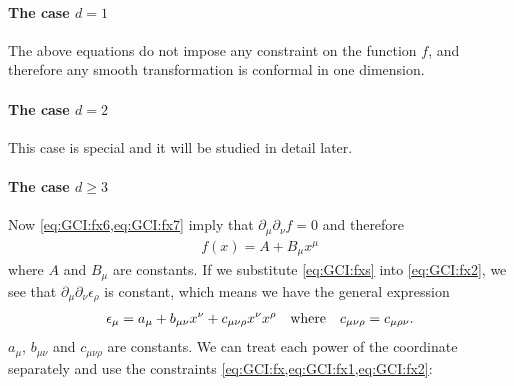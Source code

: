 \documentclass[10pt]{article}
\begin{document}
\paragraph{The case $d=1$}
The above equations do not impose any constraint on the function $f$, and therefore any smooth transformation is conformal in one dimension.
\paragraph{The case $d=2$}
This case is special and it will be studied in detail later.
\paragraph{The case $d\geq3$}
Now \cref{eq:GCI:fx6,eq:GCI:fx7} imply that $\partial_\mu\partial_\nu f=0$ and therefore 
\begin{align}
    f(x)=A+B_\mu x^\mu\label{eq:GCI:fxs}
\end{align}
where $A$ and $B_\mu$ are constants.
If we substitute \cref{eq:GCI:fxs} into \cref{eq:GCI:fx2}, we see that $\partial_\mu\partial_\nu\epsilon_\rho$ is constant, which means we have the general expression 
\begin{align}
    \epsilon_\mu=a_\mu+b_{\mu\nu}x^\nu+c_{\mu\nu\rho}x^\nu x^\rho\qq{where}c_{\mu\nu\rho}=c_{\mu\rho\nu}.
\end{align}
$a_\mu$, $b_{\mu\nu}$ and $c_{\mu\nu\rho}$ are constants.
We can treat each power of the coordinate separately and use the constraints \cref{eq:GCI:fx,eq:GCI:fx1,eq:GCI:fx2}:
\end{document}
